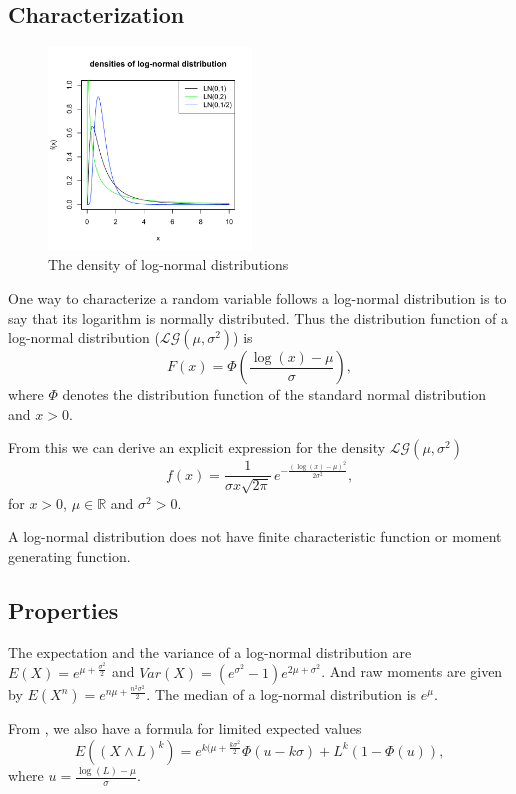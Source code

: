 \subsection{Characterization}
\begin{figure}
  \begin{center}
    \includegraphics[width=0.48\textwidth]{img/lognormaldistrzoom}
  \end{center}
  \caption{The density of log-normal distributions}
\end{figure}

One way to characterize a random variable follows a log-normal distribution is to say that its logarithm is normally distributed. Thus the distribution function of a log-normal distribution ($\mathcal L \mathcal G(\mu,\sigma^2)$) is
$$
F(x) = \Phi\left(\frac{\log(x)-\mu}{\sigma}\right),
$$
where $\Phi$ denotes the distribution function of the standard normal distribution and $x>0$.

From this we can derive an explicit expression for the density $\mathcal L \mathcal G(\mu,\sigma^2)$
$$
f(x) =  \frac{1}{\sigma x \sqrt{2\pi}} \,e^{ -\frac{(\log(x)- \mu)^2}{2\sigma^2}},
$$
for $x>0$, $\mu\in\mathbb R$ and $\sigma^2 >0$.

A log-normal distribution does not have finite characteristic function or moment generating function.

\subsection{Properties}
The expectation and the variance of a log-normal distribution are $E(X) = e^{\mu+\frac{\sigma^2}{2}}$ and $Var(X) = (e^{\sigma^2}-1)e^{2\mu+\sigma^2}$. And raw moments are given by $E(X^n) = e^{n\mu + \frac{n^2\sigma^2}{2}}$. The median of a log-normal distribution is $e^\mu$.

From \cite{klugman}, we also have a formula for limited expected values
$$
E\left((X\wedge L)^k\right) = e^{k(\mu+\frac{k\sigma^2}{2}} \Phi(u-k\sigma) + L^k (1- \Phi(u)),
$$
where $u=\frac{\log(L)-\mu}{\sigma}$.

